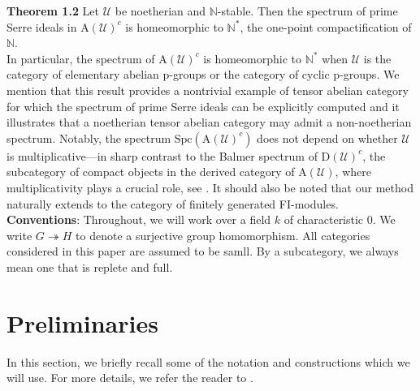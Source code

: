 \documentclass[11pt,a4paper]{amsart}
\numberwithin{equation}{section} \theoremstyle{plain}
\begin{document}
 \vspace{2mm}
  {\bf Theorem 1.2 }  Let $\mathcal{U}$ be  noetherian and $\mathbb{N}$-stable. Then the spectrum of prime Serre ideals in  $\mathrm{A}(\mathcal{U})^{c}$ is homeomorphic to $\mathbb{N}^{*}$, the one-point compactification of $\mathbb{N}$.\\

In particular, the spectrum of $\mathrm{A}(\mathcal{U})^{c}$ is homeomorphic to $\mathbb{N}^{*}$ when $\mathcal{U}$ is the category of elementary abelian p-groups or the category of cyclic p-groups. We mention that this result  provides a nontrivial example of tensor abelian category for which the spectrum of prime Serre ideals can be explicitly computed and it illustrates that a noetherian tensor abelian category may admit a non-noetherian spectrum. Notably,  the spectrum  $\mathrm{Spc}(\mathrm{A}(\mathcal{U})^{c})$ does not depend on whether $\mathcal{U}$ is multiplicative---in sharp contrast to the Balmer spectrum of $\mathrm{D}(\mathcal{U})^{c}$, the subcategory of compact objects in the derived category of $\mathrm{A}(\mathcal{U})$, where multiplicativity plays a crucial role, see \cite[Theorem 6.13, Example 12.10]{BBP+25b}. It should also be noted that our method naturally extends to the category of finitely generated FI-modules.\\


\textbf{Conventions}: Throughout, we  will work over a field $k$ of characteristic 0. We write $G\twoheadrightarrow H$ to denote a surjective group homomorphism. All categories considered in this paper are assumed to be samll. By a subcategory, we always mean one that is replete and full.










\section { \bf Preliminaries}
In this section, we briefly recall some of the notation and constructions which we will use.  For more details, we refer the reader to \cite{PS22,BBP+25a}.
\end{document}
